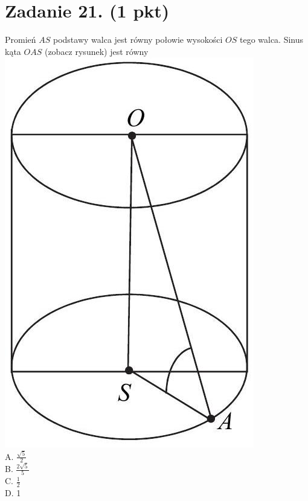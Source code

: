 \documentclass[10pt]{article}
\begin{document}
\section*{Zadanie 21. (1 pkt)}
Promień \(A S\) podstawy walca jest równy połowie wysokości \(O S\) tego walca. Sinus kąta \(O A S\) (zobacz rysunek) jest równy\\
\includegraphics[max width=\textwidth, center]{2024_11_21_d51d653f4fe4a5bb0c33g-10(1)}\\
A. \(\frac{\sqrt{5}}{2}\)\\
B. \(\frac{2 \sqrt{5}}{5}\)\\
C. \(\frac{1}{2}\)\\
D. 1
\end{document}
